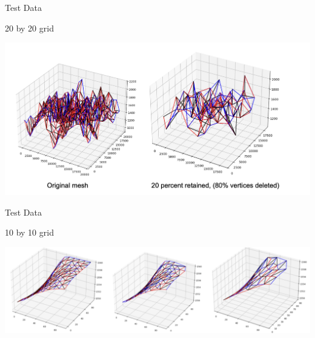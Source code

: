 \begin{frame}{Test Data}
\begin{center}
    
        20 by 20 grid
        
    \end{center}
    \begin{center}
        \includegraphics[scale=.58]{images/20by20.png}
        
    \end{center}

\end{frame}

\begin{frame}{Test Data}
    \begin{center}
        
            10 by 10 grid
            
        \end{center}
        \begin{center}
            \includegraphics[scale=.6]{images/10by10.png}
    
            
        \end{center}
    
    \end{frame}